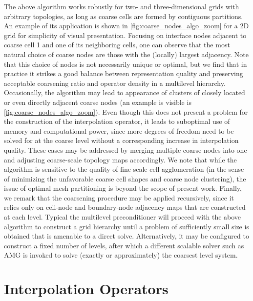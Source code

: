 The above algorithm works robustly for two- and three-dimensional grids with arbitrary topologies, as long as coarse cells are formed by contiguous partitions.   An example of its application is shown in \cref{fig:coarse_nodes_algo_zoom} for a 2D grid for simplicity of visual presentation.   Focusing on interface nodes adjacent to coarse cell 1 and one of its neighboring cells, one can observe that the most natural choice of coarse nodes are those with the (locally) largest adjacency.   Note that this choice of nodes is not necessarily unique or optimal, but we find that in practice it strikes a good balance between representation quality and preserving acceptable coarsening ratio and operator density in a multilevel hierarchy.   Occasionally, the algorithm may lead to appearance of clusters of closely located or even directly adjacent coarse nodes (an example is visible is \cref{fig:coarse_nodes_algo_zoom}). Even though this does not present a problem for the construction of the interpolation operator, it leads to suboptimal use of memory and computational power, since more degrees of freedom need to be solved for at the coarse level without a corresponding increase in interpolation quality.   These cases may be addressed by merging multiple coarse nodes into one and adjusting coarse-scale topology maps accordingly.   We note that while the algorithm is sensitive to the quality of fine-scale cell agglomeration (in the sense of minimizing the unfavorable coarse cell shapes and coarse node clustering), the issue of optimal mesh partitioning is beyond the scope of present work.   Finally, we remark that the coarsening procedure may be applied recursively, since it relies only on cell-node and boundary-node adjacency maps that are constructed at each level.   Typical the multilevel preconditioner will proceed with the above algorithm to construct a grid hierarchy until a problem of sufficiently small size is obtained that is amenable to a direct solve.   Alternatively, it may be configured to construct a fixed number of levels, after which a different scalable solver such as AMG is invoked to solve (exactly or approximately) the coarsest level system.

\section{Interpolation Operators}
\label{sec:msrsb_interpolation} 

